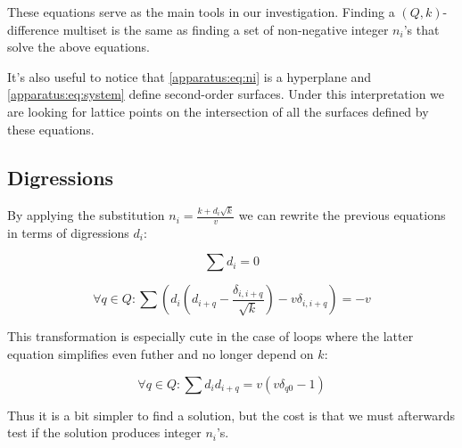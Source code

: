     These equations serve as the main tools in our investigation. Finding a $(Q,k)$-difference multiset is the same as finding a set of non-negative integer $n_i$'s that solve the above equations. 
    
    It's also useful to notice that \eqref{apparatus:eq:ni} is a hyperplane and \eqref{apparatus:eq:system} define second-order surfaces. Under this interpretation we are looking for lattice points on the intersection of all the surfaces defined by these equations.

\subsection{Digressions}
\label{sec:digressions}
    By applying the substitution $n_i=\frac{k+d_i \sqrt k}v$ we can rewrite the previous equations in terms of digressions $d_i$:
    
    \begin{equation}
        \label{apparatus:eq:di}
        \sum {d_i} = 0
    \end{equation}
    
    \begin{equation}
        \label{apparatus:eq:dsystem_general}
        \forall q \in Q \colon \sum (d_i (d_{i+q}-\frac{\delta_{i,i+q}}{\sqrt k})-v\delta_{i,i+q}) = -v
    \end{equation}
    
    This transformation is especially cute in the case of loops where the latter equation simplifies even futher and no longer depend on $k$:
    
    \begin{equation}
        \label{apparatus:eq:dsystem}
        \forall q \in Q \colon \sum d_i d_{i+q} = v (v \delta_{q0}-1)
    \end{equation}
    
    Thus it is a bit simpler to find a solution, but the cost is that we must afterwards test if the solution produces integer $n_i$'s.
    
